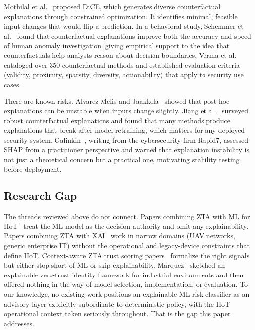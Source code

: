 \documentclass[conference]{IEEEtran}
\begin{document}
Mothilal et al.~\cite{mothilal2020} proposed DiCE, which generates diverse counterfactual explanations through constrained optimization. It identifies minimal, feasible input changes that would flip a prediction. In a behavioral study, Schemmer et al.~\cite{schemmer2023} found that counterfactual explanations improve both the accuracy and speed of human anomaly investigation, giving empirical support to the idea that counterfactuals help analysts reason about decision boundaries. Verma et al.~\cite{verma2024} cataloged over 350 counterfactual methods and established evaluation criteria (validity, proximity, sparsity, diversity, actionability) that apply to security use cases.

There are known risks. Alvarez-Melis and Jaakkola~\cite{alvarez2018} showed that post-hoc explanations can be unstable when inputs change slightly. Jiang et al.~\cite{jiang2024} surveyed robust counterfactual explanations and found that many methods produce explanations that break after model retraining, which matters for any deployed security system. Galinkin~\cite{galinkin2022}, writing from the cybersecurity firm Rapid7, assessed SHAP from a practitioner perspective and warned that explanation instability is not just a theoretical concern but a practical one, motivating stability testing before deployment.

\subsection{Research Gap}

The threads reviewed above do not connect. Papers combining ZTA with ML for IIoT~\cite{laghari2025, feng2023} treat the ML model as the decision authority and omit any explainability. Papers combining ZTA with XAI~\cite{haque2024, nkoro2024} work in narrow domains (UAV networks, generic enterprise IT) without the operational and legacy-device constraints that define IIoT. Context-aware ZTA trust scoring papers~\cite{xiao2022, jeong2025} formalize the right signals but either stop short of ML or skip explainability. Marquez~\cite{marquez2025} sketched an explainable zero-trust identity framework for industrial environments and then offered nothing in the way of model selection, implementation, or evaluation. To our knowledge, no existing work positions an explainable ML risk classifier as an advisory layer explicitly subordinate to deterministic policy, with the IIoT operational context taken seriously throughout. That is the gap this paper addresses.
\end{document}
